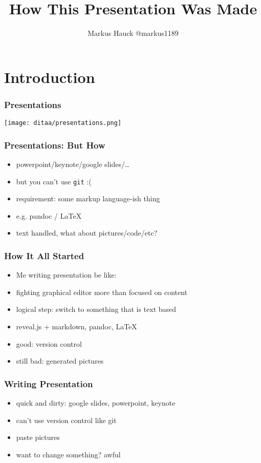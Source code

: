 \documentclass{beamer}
\title{How This Presentation Was Made}
\author{Markus Hauck @markus1189}
\begin{document}
\begin{frame}
  \titlepage{}
\end{frame}

\section{Introduction}\label{sec:introduction}

\begin{frame}
  \frametitle{Presentations}
  \begin{center}
    \texttt{[image: ditaa/presentations.png]}
  \end{center}
\end{frame}

\begin{frame}
  \frametitle{Presentations: But How}
  \begin{itemize}
  \item<1-> powerpoint/keynote/google slides/\ldots{}
  \item<2-> but you can't use \texttt{git} :(
  \item<3-> requirement: some markup language-ish thing
  \item<4-> e.g. pandoc / LaTeX
  \item<5-> text handled, what about pictures/code/etc?
  \end{itemize}
\end{frame}

\begin{frame}
  \frametitle{How It All Started}
  \begin{itemize}
  \item Me writing presentation be like:
  \item fighting graphical editor more than focused on content
  \item logical step: switch to something that is text based
  \item reveal.js + markdown, pandoc, LaTeX
  \item good: version control
  \item still bad: generated pictures
  \end{itemize}
\end{frame}

\begin{frame}
  \frametitle{Writing Presentation}
  \begin{itemize}
  \item quick and dirty: google slides, powerpoint, keynote
  \item can't use version control like git
  \item paste pictures
  \item want to change something? awful
  \end{itemize}
\end{frame}
\end{document}
